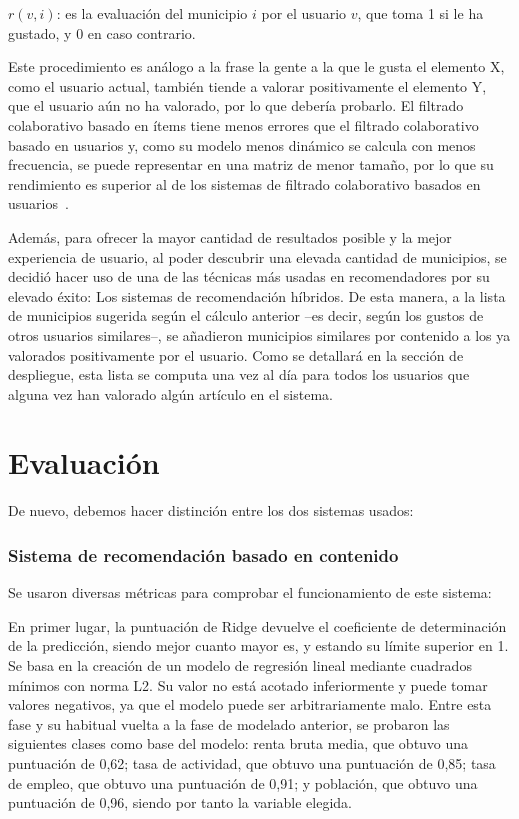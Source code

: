 $r(v, i)$: es la evaluación del municipio $i$ por el usuario $v$, que toma 1 si le ha gustado, y 0 en caso contrario.

Este procedimiento es análogo a la frase \guillemotleft la gente a la que le gusta el elemento X, como el usuario actual, también tiende a valorar positivamente el elemento Y, que el usuario aún no ha valorado, por lo que debería probarlo\guillemotright. El filtrado colaborativo basado en ítems tiene menos errores que el filtrado colaborativo basado en usuarios y, como su modelo menos dinámico se calcula con menos frecuencia, se puede representar en una matriz de menor tamaño, por lo que su rendimiento es superior al de los sistemas de filtrado colaborativo basados en usuarios~\cite{filtro_colaborativo_3}.

Además, para ofrecer la mayor cantidad de resultados posible y la mejor experiencia de usuario, al poder descubrir una elevada cantidad de municipios, se decidió hacer uso de una de las técnicas más usadas en recomendadores por su elevado éxito: Los sistemas de recomendación híbridos. De esta manera, a la lista de municipios sugerida según el cálculo anterior –es decir, según los gustos de otros usuarios similares–, se añadieron municipios similares por contenido a los ya valorados positivamente por el usuario. Como se detallará en la sección de despliegue, esta lista se computa una vez al día para todos los usuarios que alguna vez han valorado algún artículo en el sistema.

\section{Evaluación}

De nuevo, debemos hacer distinción entre los dos sistemas usados:

\subsubsection{Sistema de recomendación basado en contenido}

Se usaron diversas métricas para comprobar el funcionamiento de este sistema:

En primer lugar, la puntuación de Ridge devuelve el coeficiente de determinación de la predicción, siendo mejor cuanto mayor es, y estando su límite superior en 1. Se basa en la creación de un modelo de regresión lineal mediante cuadrados mínimos con norma L2. Su valor no está acotado inferiormente y puede tomar valores negativos, ya que el modelo puede ser arbitrariamente malo. Entre esta fase y su habitual vuelta a la fase de modelado anterior, se probaron las siguientes clases como base del modelo: renta bruta media, que obtuvo una puntuación de 0,62; tasa de actividad, que obtuvo una puntuación de 0,85; tasa de empleo, que obtuvo una puntuación de 0,91; y población, que obtuvo una puntuación de 0,96, siendo por tanto la variable elegida.


